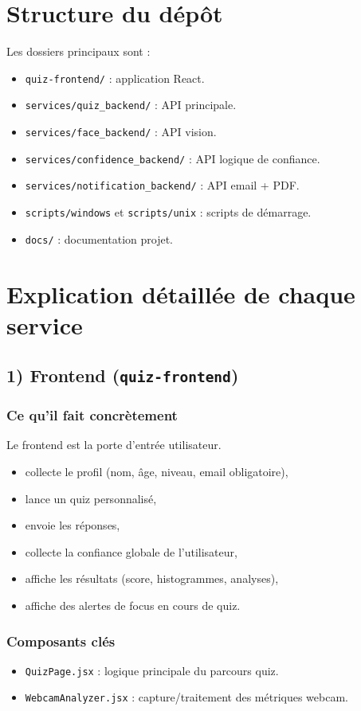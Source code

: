 \documentclass[12pt,a4paper]{article}
\begin{document}
\section{Structure du d\'ep\^ot}
Les dossiers principaux sont :
\begin{itemize}
    \item \texttt{quiz-frontend/} : application React.
    \item \texttt{services/quiz\_backend/} : API principale.
    \item \texttt{services/face\_backend/} : API vision.
    \item \texttt{services/confidence\_backend/} : API logique de confiance.
    \item \texttt{services/notification\_backend/} : API email + PDF.
    \item \texttt{scripts/windows} et \texttt{scripts/unix} : scripts de d\'emarrage.
    \item \texttt{docs/} : documentation projet.
\end{itemize}

\section{Explication d\'etaill\'ee de chaque service}

\subsection{1) Frontend (\texttt{quiz-frontend})}
\subsubsection{Ce qu'il fait concr\`etement}
Le frontend est la porte d'entr\'ee utilisateur.
\begin{itemize}
    \item collecte le profil (nom, \^age, niveau, email obligatoire),
    \item lance un quiz personnalis\'e,
    \item envoie les r\'eponses,
    \item collecte la confiance globale de l'utilisateur,
    \item affiche les r\'esultats (score, histogrammes, analyses),
    \item affiche des alertes de focus en cours de quiz.
\end{itemize}

\subsubsection{Composants cl\'es}
\begin{itemize}
    \item \texttt{QuizPage.jsx} : logique principale du parcours quiz.
    \item \texttt{WebcamAnalyzer.jsx} : capture/traitement des m\'etriques webcam.
\end{itemize}
\end{document}
